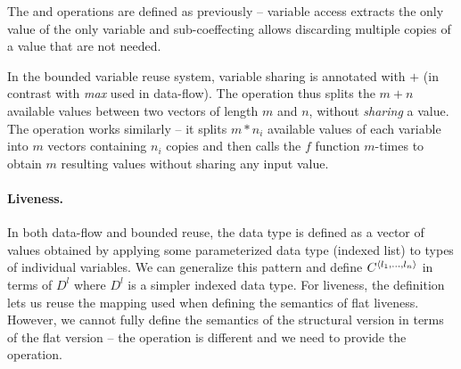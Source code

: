 \noindent
The  and  operations are defined as previously -- variable access 
extracts the only value of the only variable and sub-coeffecting allows discarding multiple
copies of a value that are not needed.

In the bounded variable reuse system, variable sharing is annotated with $+$ (in contrast with
\textit{max} used in data-flow). The  operation thus splits the $m+n$ available
values between two vectors of length $m$ and $n$, without \emph{sharing} a value. The 
 operation works similarly -- it splits $m\ast n_i$ available values of each
variable into $m$ vectors containing $n_i$ copies and then calls the $f$ function $m$-times to 
obtain $m$ resulting values without sharing any input value.

\paragraph{Liveness.}
In both data-flow and bounded reuse, the data type is defined as a vector of values obtained
by applying some parameterized data type (indexed list) to types of individual variables. We can
generalize this pattern and define $\ctyp{\langle l_1, \ldots, l_n \rangle}$ in terms of 
$D^{l}$ where $D^{l}$ is a simpler indexed data type. For liveness, the definition lets us 
reuse the mapping used when defining the semantics of flat liveness. However, we cannot fully
define the semantics of the structural version in terms of the flat version -- the 
 operation is different and we need to provide the  operation.

